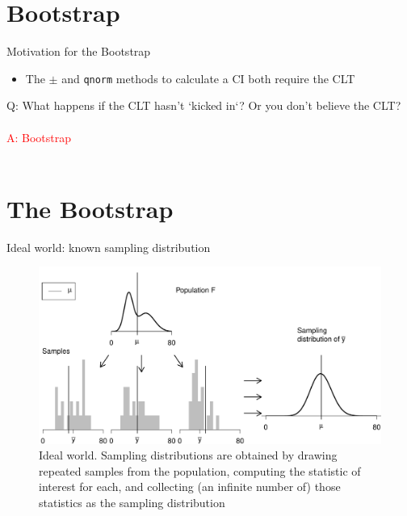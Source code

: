 \documentclass{beamer}\usepackage[]{graphicx}\usepackage[]{color}
\newenvironment{knitrout}{}{} %
\begin{document}
\section{Bootstrap}

\begin{frame}{Motivation for the Bootstrap}
\begin{itemize}
	\setlength\itemsep{2em}
	\item The $\pm$ and \texttt{qnorm} methods to calculate a CI both require the CLT
\end{itemize}

\pause

\vspace*{0.2in}

\Large \textcolor{myblue}{Q: What happens if the CLT hasn't `kicked in`? Or you don't believe the CLT?} \\ \ \\
\pause 
\Large \textcolor{red}{A: Bootstrap} \\ \ \\
\end{frame}


\section{The Bootstrap}


\begin{frame}[fragile]{Ideal world: known sampling distribution}

\begin{knitrout}\scriptsize
{}\color{fgcolor}\begin{figure}

{\centering \includegraphics[width=1\linewidth]{figure/unnamed-chunk-10-1} 

}

\caption{\scriptsize{Ideal world. Sampling distributions are obtained by drawing repeated samples from the population, computing the statistic of interest for each, and collecting (an infinite number of) those statistics as the sampling distribution}}\label{fig:unnamed-chunk-10}
\end{figure}


\end{knitrout}

\end{frame}
\end{document}
